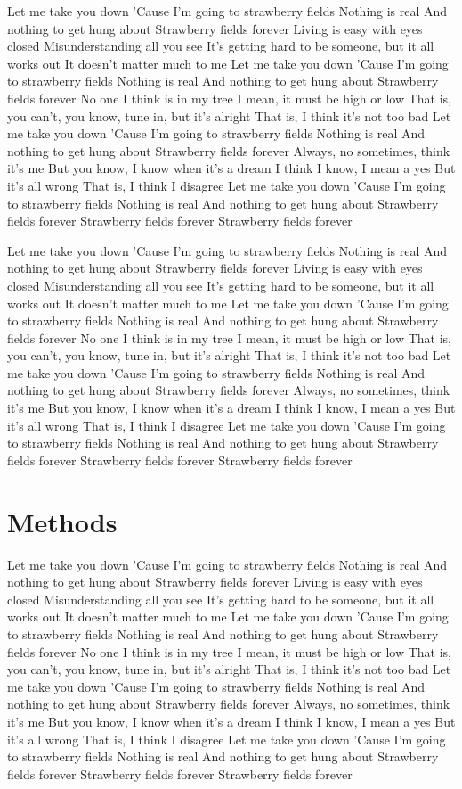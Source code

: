 \documentclass[12pt]{article}
\begin{document}
\bigskip
Let me take you down
'Cause I'm going to strawberry fields
Nothing is real
And nothing to get hung about
Strawberry fields forever
Living is easy with eyes closed
Misunderstanding all you see
It's getting hard to be someone, but it all works out
It doesn't matter much to me
Let me take you down
'Cause I'm going to strawberry fields
Nothing is real
And nothing to get hung about
Strawberry fields forever
No one I think is in my tree
I mean, it must be high or low
That is, you can't, you know, tune in, but it's alright
That is, I think it's not too bad
Let me take you down
'Cause I'm going to strawberry fields
Nothing is real
And nothing to get hung about
Strawberry fields forever
Always, no sometimes, think it's me
But you know, I know when it's a dream
I think I know, I mean a yes
But it's all wrong
That is, I think I disagree
Let me take you down
'Cause I'm going to strawberry fields
Nothing is real
And nothing to get hung about
Strawberry fields forever
Strawberry fields forever
Strawberry fields forever

Let me take you down
'Cause I'm going to strawberry fields
Nothing is real
And nothing to get hung about
Strawberry fields forever
Living is easy with eyes closed
Misunderstanding all you see
It's getting hard to be someone, but it all works out
It doesn't matter much to me
Let me take you down
'Cause I'm going to strawberry fields
Nothing is real
And nothing to get hung about
Strawberry fields forever
No one I think is in my tree
I mean, it must be high or low
That is, you can't, you know, tune in, but it's alright
That is, I think it's not too bad
Let me take you down
'Cause I'm going to strawberry fields
Nothing is real
And nothing to get hung about
Strawberry fields forever
Always, no sometimes, think it's me
But you know, I know when it's a dream
I think I know, I mean a yes
But it's all wrong
That is, I think I disagree
Let me take you down
'Cause I'm going to strawberry fields
Nothing is real
And nothing to get hung about
Strawberry fields forever
Strawberry fields forever
Strawberry fields forever

\section{Methods}
Let me take you down
'Cause I'm going to strawberry fields
Nothing is real
And nothing to get hung about
Strawberry fields forever
Living is easy with eyes closed
Misunderstanding all you see
It's getting hard to be someone, but it all works out
It doesn't matter much to me
Let me take you down
'Cause I'm going to strawberry fields
Nothing is real
And nothing to get hung about
Strawberry fields forever
No one I think is in my tree
I mean, it must be high or low
That is, you can't, you know, tune in, but it's alright
That is, I think it's not too bad
Let me take you down
'Cause I'm going to strawberry fields
Nothing is real
And nothing to get hung about
Strawberry fields forever
Always, no sometimes, think it's me
But you know, I know when it's a dream
I think I know, I mean a yes
But it's all wrong
That is, I think I disagree
Let me take you down
'Cause I'm going to strawberry fields
Nothing is real
And nothing to get hung about
Strawberry fields forever
Strawberry fields forever
Strawberry fields forever
\end{document}
